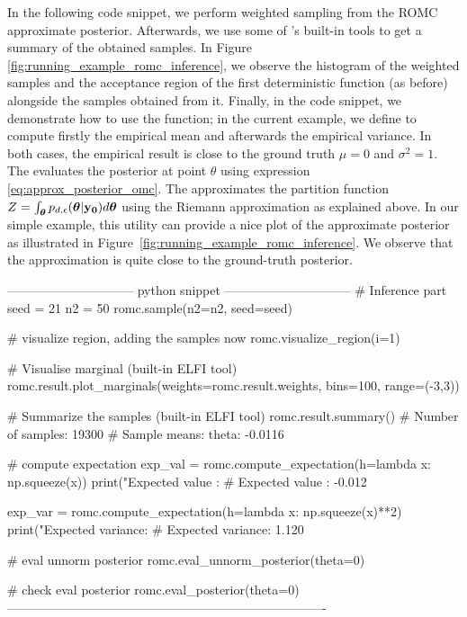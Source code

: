 In the following code snippet, we perform weighted sampling from the
ROMC approximate posterior. Afterwards, we use some of 's
built-in tools to get a summary of the obtained samples. In Figure
\ref{fig:running_example_romc_inference}, we observe the histogram of the weighted
samples and the acceptance region of the first deterministic function
(as before) alongside the samples obtained from it. Finally, in the
code snippet, we demonstrate how to use the 
function; in the current example, we define  to compute
firstly the empirical mean and afterwards the empirical variance. In
both cases, the empirical result is close to the ground truth
\(\mu = 0\) and \(\sigma^2 = 1\). The
 evaluates the posterior at
point \(\theta\) using expression \eqref{eq:approx_posterior_omc}. The
 approximates the partition function
\(Z = \int_{\boldsymbol{\theta}} p_{d,\epsilon}(\boldsymbol{\theta}|\mathbf{y_0}) d\boldsymbol{\theta}\) using the
Riemann approximation as explained above. In our simple example, this
utility can provide a nice plot of the approximate posterior as
illustrated in Figure~\ref{fig:running_example_romc_inference}. We observe that the
approximation is quite close to the ground-truth posterior.

\begin{Code}
------------------------------ python snippet ------------------------------  
  # Inference part
  seed = 21
  n2 = 50
  romc.sample(n2=n2, seed=seed)

  # visualize region, adding the samples now
  romc.visualize_region(i=1)

  # Visualise marginal (built-in ELFI tool)
  romc.result.plot_marginals(weights=romc.result.weights,
                             bins=100, range=(-3,3))

  # Summarize the samples (built-in ELFI tool)
  romc.result.summary()
  # Number of samples: 19300
  # Sample means: theta: -0.0116

  # compute expectation
  exp_val = romc.compute_expectation(h=lambda x: np.squeeze(x))
  print("Expected value   : %
  # Expected value   : -0.012

  exp_var = romc.compute_expectation(h=lambda x: np.squeeze(x)**2)
  print("Expected variance: %
  # Expected variance: 1.120

  # eval unnorm posterior
  romc.eval_unnorm_posterior(theta=0)

  # check eval posterior
  romc.eval_posterior(theta=0)
----------------------------------------------------------------------------
\end{Code}

